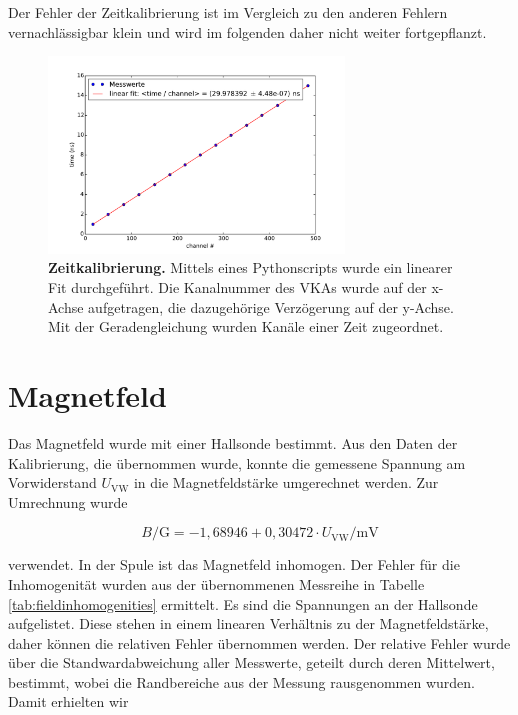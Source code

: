 \documentclass[a4paper,ngerman]{scrartcl}
\begin{document}
Der Fehler der Zeitkalibrierung ist im Vergleich zu den anderen
Fehlern vernachlässigbar klein und wird im folgenden daher nicht
weiter fortgepflanzt.

\begin{figure}[tb!]
\centering
\includegraphics[width=0.7\textwidth]{abbildungen/zeitkalibrierung.pdf}
\caption[Zeitkalibrierung]{\textbf{Zeitkalibrierung.} Mittels eines Pythonscripts wurde ein linearer Fit durchgeführt. Die Kanalnummer des VKAs wurde auf der x-Achse aufgetragen, die dazugehörige Verzögerung auf der y-Achse. Mit der Geradengleichung wurden Kanäle einer Zeit zugeordnet.}
\label{fig:zeitkalibrierung}
\end{figure}





\section{Magnetfeld}

Das Magnetfeld wurde mit einer Hallsonde bestimmt. Aus den Daten der Kalibrierung, die übernommen wurde, konnte die gemessene Spannung am Vorwiderstand $U_{\mathrm{VW}}$ in die Magnetfeldstärke umgerechnet werden. Zur Umrechnung wurde 

\begin{equation}
\label{eqn:B-gauss}
B \mathrm{/G} = -1,68946 + 0,30472 \cdot U_{\mathrm{VW}} \mathrm{/mV}
\end{equation}


verwendet. In der Spule ist das Magnetfeld inhomogen. Der Fehler für die Inhomogenität wurden aus der übernommenen Messreihe in Tabelle \ref{tab:fieldinhomogenities} ermittelt. Es sind die Spannungen an der Hallsonde aufgelistet. Diese stehen in einem linearen Verhältnis zu der Magnetfeldstärke, daher können die relativen Fehler übernommen werden. 
Der relative Fehler wurde über die Standwardabweichung aller Messwerte, geteilt durch deren Mittelwert, bestimmt, wobei die Randbereiche aus der Messung rausgenommen wurden. Damit erhielten wir
\end{document}
